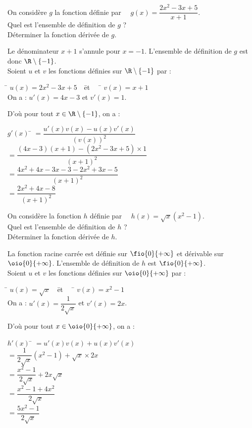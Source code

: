\documentclass[a4paper,11pt,exos]{nsi}
\begin{document}
On considère $g$ la fonction définie par $\quad g(x)=\dfrac{2x^2-3x+5}{x+1}$.\\[.5em]
Quel est l'ensemble de définition de $g$ ?\\
Déterminer la fonction dérivée de $g$.\\[.5em]
\textcolor{UGLiBlue}{
    Le dénominateur $x+1$ s'annule pour $x=-1$.    L'ensemble de définition de $g$ est donc $\R\setminus\{-1\}$.\\
    Soient $u$ et $v$ les fonctions définies sur $\R\setminus\{-1\}$ par :
    \begin{tabbing}
        \hspace*{1.5cm}\= $u(x)=2x^2-3x+5\quad$\= et $\quad$  \= $v(x)=x+1$\\
        On a :  \>$u'(x)=4x-3$\> et \>$v'(x)=1$.
    \end{tabbing}
    D'où pour tout $x\in\R\setminus\{-1\}$, on a :
    \begin{tabbing}
        $g'(x)$ \= $=\dfrac{u'(x)v(x)-u(x)v'(x)}{(v(x))^2}$\\
        \> $=\dfrac{(4x-3)(x+1)-(2x^2-3x+5)\times 1}{(x+1)^2}$\\
        \> $=\dfrac{4x^2+4x-3x-3-2x^2+3x-5}{(x+1)^2}$\\
        \> $=\dfrac{2x^2+4x-8}{(x+1)^2}$
    \end{tabbing}
}


On considère la fonction $h$ définie par $\quad h(x)=\sqrt{x}(x^2-1)$.\\[.5em]
Quel est l'ensemble de définition de $h$ ?\\
Déterminer la fonction dérivée de $h$.\\[.5em]
\textcolor{UGLiBlue}{
    La fonction racine carrée est définie sur $\fio{0}{+\infty}$ et dérivable sur $\oio{0}{+\infty}$. L'ensemble de définition de $h$ est $\fio{0}{+\infty}$.\\
    Soient $u$ et $v$ les fonctions définies sur $\oio{0}{+\infty}$ par :
    \begin{tabbing}
        \hspace*{1.5cm}\= $u(x)=\sqrt{x}\quad$\= et $\quad$  \= $v(x)=x^2-1$\\
        On a :  \>$u'(x)=\dfrac{1}{2\sqrt{x}}$\> et \>$v'(x)=2x$.
    \end{tabbing}
    D'où pour tout $x\in\oio{0}{+\infty}$, on a :
    \begin{tabbing}
        $h'(x)$ \= $=u'(x)v(x)+u(x)v'(x)$\\[.5em]
        \> $=\dfrac{1}{2\sqrt{x}}(x^2-1)+\sqrt{x}\times 2x$\\[.5em]
        \> $=\dfrac{x^2-1}{2\sqrt{x}}+2x\sqrt{x}$\\[.5em]
        \> $=\dfrac{x^2-1+4x^2}{2\sqrt{x}}$\\[.5em]
        \> $=\dfrac{5x^2-1}{2\sqrt{x}}$
    \end{tabbing}
}
\end{document}
